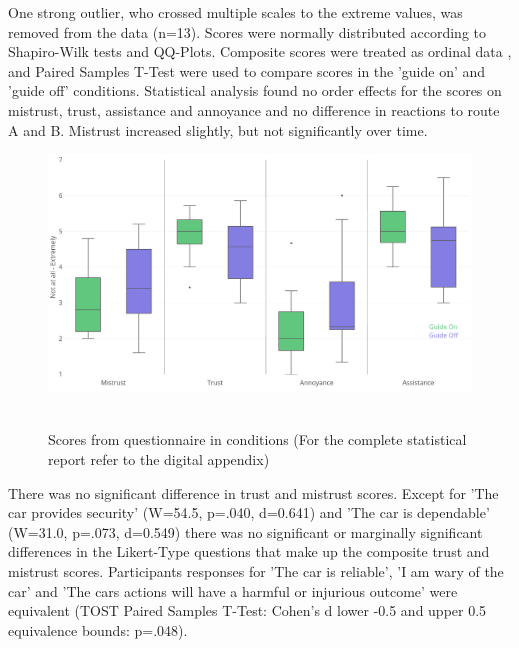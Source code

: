 One strong outlier, who crossed multiple scales to the extreme values, was removed from the data (n=13). Scores were normally distributed according to Shapiro-Wilk tests and QQ-Plots. Composite scores were treated as ordinal data \cite{Boone2012AnalyzingData}, and Paired Samples T-Test were used to compare scores in the 'guide on' and 'guide off' conditions. Statistical analysis found no order effects for the scores on mistrust, trust, assistance and annoyance and no difference in reactions to route A and B. Mistrust increased slightly, but not significantly over time. 

\begin{figure}
    \includegraphics[width=1\textwidth]{fig/questionaire.png}\hfill\
    \caption[Scores from questionnaire]{Scores from questionnaire in conditions (For the complete statistical report refer to the digital appendix)}
    \label{fig:questionaire}
\end{figure}

There was no significant difference in trust and mistrust scores. Except for 'The car provides security' (W=54.5, p=.040, d=0.641) and 'The car is dependable' (W=31.0, p=.073, d=0.549) there was no significant or marginally significant differences in the Likert-Type questions that make up the composite trust and mistrust scores. Participants responses for 'The car is reliable', 'I am wary of the car' and 'The cars actions will have a harmful or injurious outcome' were equivalent (TOST Paired Samples T-Test: Cohen's d lower -0.5 and upper 0.5 equivalence bounds: p=.048).

